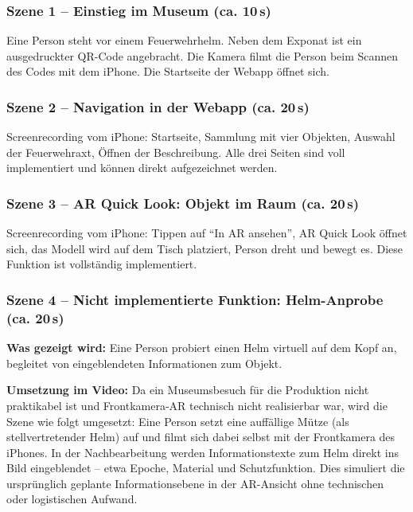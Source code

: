 \documentclass[11pt,a4paper]{article}
\begin{document}
\subsubsection*{Szene 1 -- Einstieg im Museum (ca. 10\,s)}

Eine Person steht vor einem Feuerwehrhelm. Neben dem Exponat ist ein ausgedruckter QR-Code angebracht. Die Kamera filmt die Person beim Scannen des Codes mit dem iPhone. Die Startseite der Webapp öffnet sich.

\subsubsection*{Szene 2 -- Navigation in der Webapp (ca. 20\,s)}

Screenrecording vom iPhone: Startseite, Sammlung mit vier Objekten, Auswahl der Feuerwehraxt, Öffnen der Beschreibung. Alle drei Seiten sind voll implementiert und können direkt aufgezeichnet werden.

\subsubsection*{Szene 3 -- AR Quick Look: Objekt im Raum (ca. 20\,s)}

Screenrecording vom iPhone: Tippen auf ``In AR ansehen'', AR Quick Look öffnet sich, das Modell wird auf dem Tisch platziert, Person dreht und bewegt es. Diese Funktion ist vollständig implementiert.

\subsubsection*{Szene 4 -- Nicht implementierte Funktion: Helm-Anprobe (ca. 20\,s)}

\textbf{Was gezeigt wird:} Eine Person probiert einen Helm virtuell auf dem Kopf an, begleitet von eingeblendeten Informationen zum Objekt.

\textbf{Umsetzung im Video:} Da ein Museumsbesuch für die Produktion nicht praktikabel ist und Frontkamera-AR technisch nicht realisierbar war, wird die Szene wie folgt umgesetzt: Eine Person setzt eine auffällige Mütze (als stellvertretender Helm) auf und filmt sich dabei selbst mit der Frontkamera des iPhones. In der Nachbearbeitung werden Informationstexte zum Helm direkt ins Bild eingeblendet -- etwa Epoche, Material und Schutzfunktion. Dies simuliert die ursprünglich geplante Informationsebene in der AR-Ansicht ohne technischen oder logistischen Aufwand.
\end{document}
